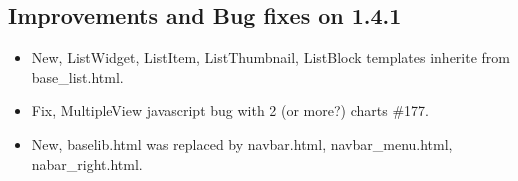 \documentclass[letterpaper,10pt,english]{sphinxmanual}
\begin{document}
\subsection{Improvements and Bug fixes on 1.4.1}
\label{versions:improvements-and-bug-fixes-on-1-4-1}\begin{itemize}
\item {} 
New, ListWidget, ListItem, ListThumbnail, ListBlock templates inherite from base\_list.html.

\item {} 
Fix, MultipleView javascript bug with 2 (or more?) charts \#177.

\item {} 
New, baselib.html was replaced by navbar.html, navbar\_menu.html, nabar\_right.html.

\end{itemize}
\end{document}
